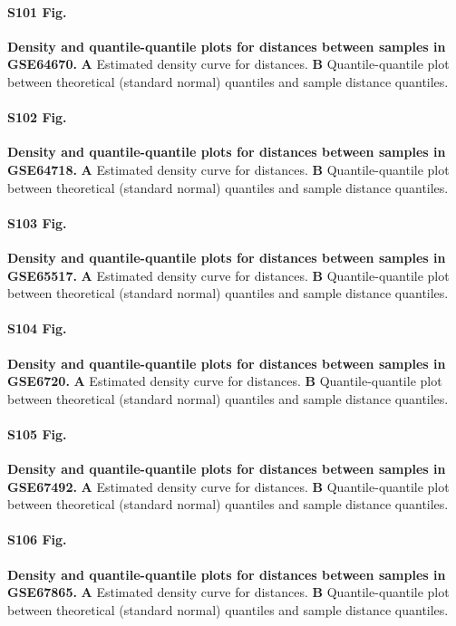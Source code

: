\documentclass[10pt,letterpaper]{article}
\begin{document}
\paragraph*{S101 Fig.}
\hypertarget{S101_Fig}{
{\bf Density and quantile-quantile plots for distances between samples in GSE64670.} \textbf{A} Estimated density curve for distances. \textbf{B} Quantile-quantile plot between theoretical (standard normal) quantiles and sample distance quantiles.}

\paragraph*{S102 Fig.}
\hypertarget{S102_Fig}{
{\bf Density and quantile-quantile plots for distances between samples in GSE64718.} \textbf{A} Estimated density curve for distances. \textbf{B} Quantile-quantile plot between theoretical (standard normal) quantiles and sample distance quantiles.}

\paragraph*{S103 Fig.}
\hypertarget{S103_Fig}{
{\bf Density and quantile-quantile plots for distances between samples in GSE65517.} \textbf{A} Estimated density curve for distances. \textbf{B} Quantile-quantile plot between theoretical (standard normal) quantiles and sample distance quantiles.}

\paragraph*{S104 Fig.}
\hypertarget{S104_Fig}{
{\bf Density and quantile-quantile plots for distances between samples in GSE6720.} \textbf{A} Estimated density curve for distances. \textbf{B} Quantile-quantile plot between theoretical (standard normal) quantiles and sample distance quantiles.}

\paragraph*{S105 Fig.}
\hypertarget{S105_Fig}{
{\bf Density and quantile-quantile plots for distances between samples in GSE67492.} \textbf{A} Estimated density curve for distances. \textbf{B} Quantile-quantile plot between theoretical (standard normal) quantiles and sample distance quantiles.}

\paragraph*{S106 Fig.}
\hypertarget{S106_Fig}{
{\bf Density and quantile-quantile plots for distances between samples in GSE67865.} \textbf{A} Estimated density curve for distances. \textbf{B} Quantile-quantile plot between theoretical (standard normal) quantiles and sample distance quantiles.}
\end{document}
